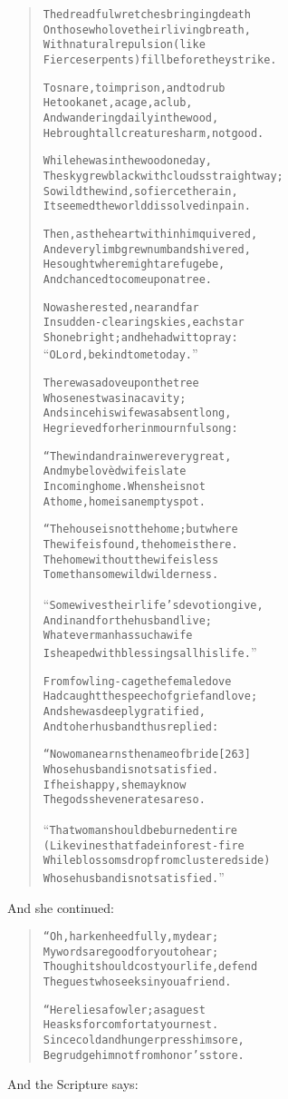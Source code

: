 \documentclass[article, twoside, 14pt]{memoir}
\renewenvironment{verbatim}{%
\begin{quote}%
\vskip -10pt%
\begin{alltt}\normalfont\large}{\end{alltt}%
\end{quote}%
\vskip -10pt
} %
\begin{document}
\begin{verbatim}
The dreadful wretches bringing death
On those who love their living breath,
With natural repulsion (like
Fierce serpents) fill before they strike.

To snare, to imprison, and to drub
He took a net, a cage, a club,
And wandering daily in the wood,
He brought all creatures harm, not good.

While he was in the wood one day,
The sky grew black with clouds straightway;
So wild the wind, so fierce the rain,
It seemed the world dissolved in pain.

Then, as the heart within him quivered,
And every limb grew numb and shivered,
He sought where might a refuge be,
And chanced to come upon a tree.

Now as he rested, near and far
In sudden-clearing skies, each star
Shone bright; and he had wit to pray:
“O Lord, be kind to me today.”

There was a dove upon the tree
Whose nest was in a cavity;
And since his wife was absent long,
He grieved for her in mournful song:

“The wind and rain were very great,
And my belovèd wife is late
In coming home. When she is not
At home, home is an empty spot.

“The house is not the home; but where
The wife is found, the home is there.
The home without the wife is less
To me than some wild wilderness.

“Some wives their life's devotion give,
And in and for the husband live;
Whatever man has such a wife
Is heaped with blessings all his life.”

From fowling-cage the female dove
Had caught the speech of grief and love;
And she was deeply gratified,
And to her husband thus replied:

“No woman earns the name of bride                       [263]
Whose husband is not satisfied.
If he is happy, she may know
The gods she venerates are so.

“That woman should be burned entire
(Like vines that fade in forest-fire
While blossoms drop from clustered side)
Whose husband is not satisfied.”
\end{verbatim}
And she continued:

\begin{verbatim}
“Oh, harken heedfully, my dear;
My words are good for you to hear;
Though it should cost your life, defend
The guest who seeks in you a friend.

“Here lies a fowler; as a guest
He asks for comfort at your nest.
Since cold and hunger press him sore,
Begrudge him not from honor's store.
\end{verbatim}
And the Scripture says:
\end{document}
